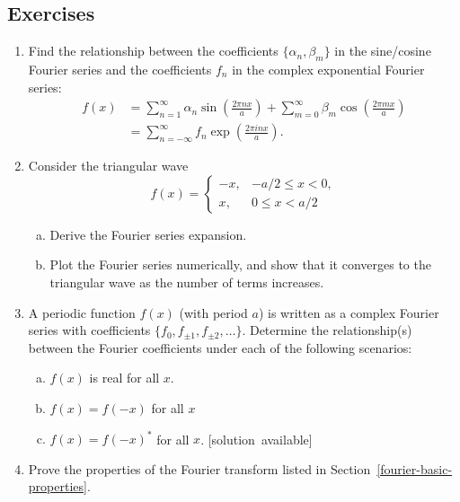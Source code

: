 \documentclass[10pt,a4paper]{article}
\begin{document}
\subsection{Exercises}\label{exercises}

\begin{enumerate}
\item
  Find the relationship between the coefficients
  $\{\alpha_n, \beta_m\}$ in the sine/cosine Fourier series and the
  coefficients $f_n$ in the complex exponential Fourier
  series:
  \begin{align}
    f(x) &= \sum_{n=1}^\infty \alpha_n \sin\left(\frac{2\pi n x}{a}\right) + \sum_{m=0}^\infty \beta_m \cos\left(\frac{2 \pi m x}{a}\right) \\
    &= \sum_{n=-\infty}^\infty f_n \exp\left(\frac{2\pi i n x}{a}\right).
  \end{align}

\item
  Consider the triangular wave
  \begin{equation}
    f(x) = \left\{\begin{array}{rr}- x, &-a/2 \le x < 0, \\
    x, & 0 \le x < a/2\end{array}\right.
  \end{equation}

  \begin{enumerate}[(a)]
  \item
    Derive the Fourier series expansion.

  \item
    Plot the Fourier series numerically, and show that it converges to
    the triangular wave as the number of terms increases.
  \end{enumerate}

\item
  A periodic function $f(x)$ (with period $a$) is written as a complex
  Fourier series with coefficients $\{f_0, f_{\pm1}, f_{\pm2},
  \dots\}$. Determine the relationship(s) between the Fourier
  coefficients under each of the following scenarios:
  \begin{enumerate}[(a)]
  \item $f(x)$ is real for all $x$.
  \item $f(x) = f(-x)$ for all $x$
  \item $f(x) = f(-x)^*$ for all $x$.
  \hfill{\scriptsize [solution~available]}
  \end{enumerate}

\item
  Prove the properties of the Fourier transform listed in
  Section~\ref{fourier-basic-properties}.


\end{enumerate}
\end{document}
